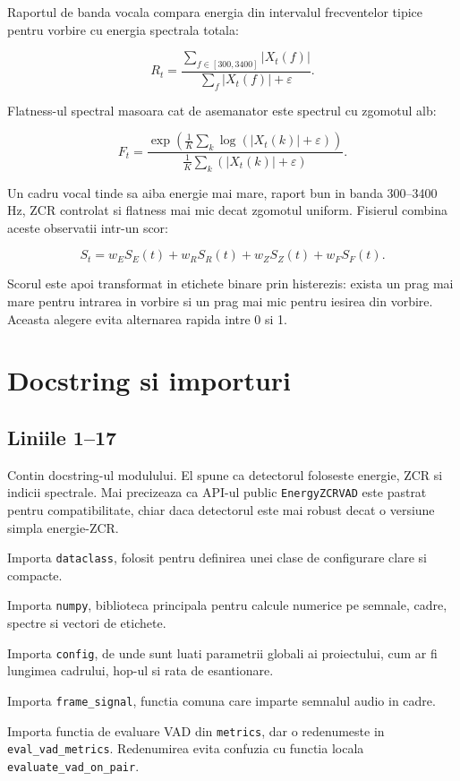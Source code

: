 \documentclass[12pt,a4paper]{report}
\newcommand{\codechunk}[2]{
    
}
\begin{document}
Raportul de banda vocala compara energia din intervalul frecventelor tipice pentru vorbire cu energia spectrala totala:

\[
R_t =
\frac{\sum_{f \in [300,3400]} |X_t(f)|}
{\sum_f |X_t(f)| + \varepsilon}.
\]

Flatness-ul spectral masoara cat de asemanator este spectrul cu zgomotul alb:

\[
F_t =
\frac{
\exp\left(\frac{1}{K}\sum_k \log(|X_t(k)|+\varepsilon)\right)}
{\frac{1}{K}\sum_k (|X_t(k)|+\varepsilon)}.
\]

Un cadru vocal tinde sa aiba energie mai mare, raport bun in banda 300--3400 Hz, ZCR controlat si flatness mai mic decat zgomotul uniform. Fisierul combina aceste observatii intr-un scor:

\[
S_t =
w_E S_E(t) + w_R S_R(t) + w_Z S_Z(t) + w_F S_F(t).
\]

Scorul este apoi transformat in etichete binare prin histerezis: exista un prag mai mare pentru intrarea in vorbire si un prag mai mic pentru iesirea din vorbire. Aceasta alegere evita alternarea rapida intre 0 si 1.

\chapter{Docstring si importuri}

\section{Liniile 1--17}

\codechunk{1}{17}

\begin{description}[leftmargin=2.9cm,style=nextline]
    \item[Liniile 1--10] Contin docstring-ul modulului. El spune ca detectorul foloseste energie, ZCR si indicii spectrale. Mai precizeaza ca API-ul public \texttt{EnergyZCRVAD} este pastrat pentru compatibilitate, chiar daca detectorul este mai robust decat o versiune simpla energie-ZCR.
    \item[Linia 12] Importa \texttt{dataclass}, folosit pentru definirea unei clase de configurare clare si compacte.
    \item[Linia 13] Importa \texttt{numpy}, biblioteca principala pentru calcule numerice pe semnale, cadre, spectre si vectori de etichete.
    \item[Linia 15] Importa \texttt{config}, de unde sunt luati parametrii globali ai proiectului, cum ar fi lungimea cadrului, hop-ul si rata de esantionare.
    \item[Linia 16] Importa \texttt{frame\_signal}, functia comuna care imparte semnalul audio in cadre.
    \item[Linia 17] Importa functia de evaluare VAD din \texttt{metrics}, dar o redenumeste in \texttt{eval\_vad\_metrics}. Redenumirea evita confuzia cu functia locala \texttt{evaluate\_vad\_on\_pair}.
\end{description}
\end{document}

